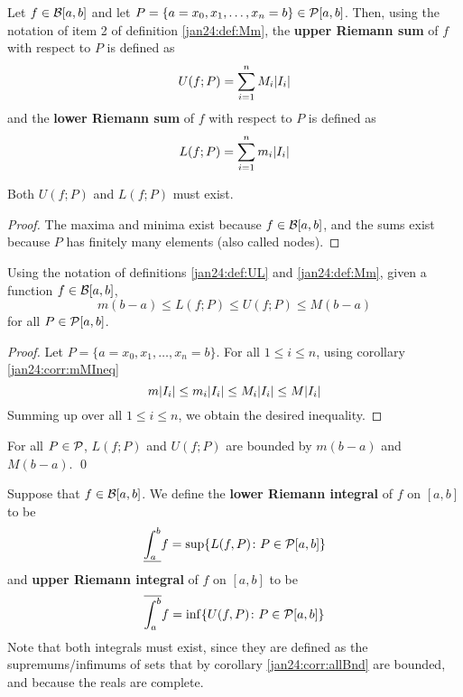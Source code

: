 \begin{defn}
  \label{jan24:def:UL}
  Let $f \in \mathcal{B}[a, b]$ and let $P = \{a = x_0, x_1, \dots , x_n = b \} \in \mathcal{P}[a, b]$. Then, using the notation of item 2 of definition \ref{jan24:def:Mm}, the \textbf{upper Riemann sum} of $f$ with respect to $P$ is defined as
  \[
    U(f; P) = \sum_{i=1}^n M_i\abs{I_i}
  \]
  and the \textbf{lower Riemann sum} of $f$ with respect to $P$ is defined as
  \[
    L(f; P) = \sum_{i=1}^n m_i\abs{I_i}
  \]
\end{defn}

\begin{claim}
  Both $U(f; P)$ and $L(f; P)$ must exist.
\end{claim}

\begin{proof}
  The maxima and minima exist because $f \in\mathcal{B}[a, b]$, and the sums exist because $P$ has finitely many elements (also called nodes).
  \hfill
\end{proof}

\begin{thm}
  Using the notation of definitions \ref{jan24:def:UL} and \ref{jan24:def:Mm}, given a function $f \in \mathcal{B}[a, b]$,
  \[
    m(b-a) \leq L(f; P) \leq U(f; P) \leq M(b-a)
  \]
  for all $P \in \mathcal{P}[a, b]$.
\end{thm}

\begin{proof}
  Let $P = \{a = x_0, x_1, \dots , x_n = b \}$. For all $1 \leq i \leq n$, using corollary \ref{jan24:corr:mMIneq}
  \[
    m\abs{I_i} \leq m_i\abs{I_i} \leq M_i\abs{I_i} \leq M\abs{I_i}
  \]
  Summing up over all $1 \leq i \leq n$, we obtain the desired inequality.
\end{proof}

\begin{corr}
  \label{jan24:corr:allBnd}
  For all $P \in \mathcal{P}$, $L(f; P)$ and $U(f; P)$ are bounded by $m(b-a)$ and $M(b-a)$. \qed
\end{corr}

\begin{defn}
  Suppose that $f \in \mathcal{B}[a, b]$. We define the \textbf{lower Riemann integral} of $f$ on $[a, b]$ to be
  \[
    \underline{\int_a^b} f = \sup\{L(f, P) \colon P \in \mathcal{P}[a, b] \}
  \]
  and \textbf{upper Riemann integral} of $f$ on $[a, b]$ to be
  \[
    \overline{\int_a^b} f = \inf\{U(f, P) \colon P \in \mathcal{P}[a, b] \}
  \]
  Note that both integrals must exist, since they are defined as the supremums/infimums of sets that by corollary \ref{jan24:corr:allBnd} are bounded, and because the reals are complete.
\end{defn}

